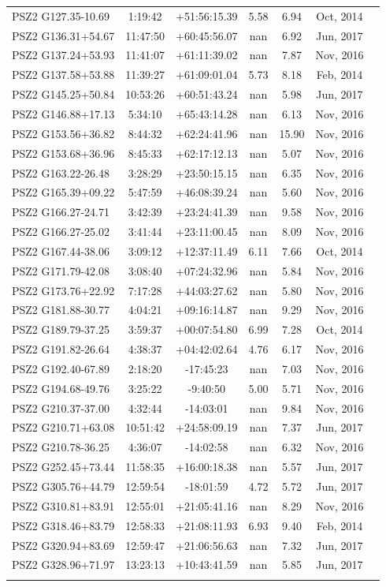\documentclass[apj, revtex4]{emulateapj}
\begin{document}
\begin{longtable*}{lcccccc}
PSZ2 G127.35-10.69 & 1:19:42 & +51:56:15.39 & 5.58 & 6.94 & Oct, 2014\\
PSZ2 G136.31+54.67 & 11:47:50 & +60:45:56.07 & nan & 6.92 & Jun, 2017\\
PSZ2 G137.24+53.93 & 11:41:07 & +61:11:39.02 & nan & 7.87 & Nov, 2016\\
PSZ2 G137.58+53.88 & 11:39:27 & +61:09:01.04 & 5.73 & 8.18 & Feb, 2014\\
PSZ2 G145.25+50.84 & 10:53:26 & +60:51:43.24 & nan & 5.98 & Jun, 2017\\
PSZ2 G146.88+17.13 & 5:34:10 & +65:43:14.28 & nan & 6.13 & Nov, 2016\\
PSZ2 G153.56+36.82 & 8:44:32 & +62:24:41.96 & nan & 15.90 & Nov, 2016\\
PSZ2 G153.68+36.96 & 8:45:33 & +62:17:12.13 & nan & 5.07 & Nov, 2016\\
PSZ2 G163.22-26.48 & 3:28:29 & +23:50:15.15 & nan & 6.35 & Nov, 2016\\
PSZ2 G165.39+09.22 & 5:47:59 & +46:08:39.24 & nan & 5.60 & Nov, 2016\\
PSZ2 G166.27-24.71 & 3:42:39 & +23:24:41.39 & nan & 9.58 & Nov, 2016\\
PSZ2 G166.27-25.02 & 3:41:44 & +23:11:00.45 & nan & 8.09 & Nov, 2016\\
PSZ2 G167.44-38.06 & 3:09:12 & +12:37:11.49 & 6.11 & 7.66 & Oct, 2014\\
PSZ2 G171.79-42.08 & 3:08:40 & +07:24:32.96 & nan & 5.84 & Nov, 2016\\
PSZ2 G173.76+22.92 & 7:17:28 & +44:03:27.62 & nan & 5.80 & Nov, 2016\\
PSZ2 G181.88-30.77 & 4:04:21 & +09:16:14.87 & nan & 9.29 & Nov, 2016\\
PSZ2 G189.79-37.25 & 3:59:37 & +00:07:54.80 & 6.99 & 7.28 & Oct, 2014\\
PSZ2 G191.82-26.64 & 4:38:37 & +04:42:02.64 & 4.76 & 6.17 & Nov, 2016\\
PSZ2 G192.40-67.89 & 2:18:20 & -17:45:23 & nan & 7.03 & Nov, 2016\\
PSZ2 G194.68-49.76 & 3:25:22 & -9:40:50 & 5.00 & 5.71 & Nov, 2016\\
PSZ2 G210.37-37.00 & 4:32:44 & -14:03:01 & nan & 9.84 & Nov, 2016\\
PSZ2 G210.71+63.08 & 10:51:42 & +24:58:09.19 & nan & 7.37 & Jun, 2017\\
PSZ2 G210.78-36.25 & 4:36:07 & -14:02:58 & nan & 6.32 & Nov, 2016\\
PSZ2 G252.45+73.44 & 11:58:35 & +16:00:18.38 & nan & 5.57 & Jun, 2017\\
PSZ2 G305.76+44.79 & 12:59:54 & -18:01:59 & 4.72 & 5.72 & Jun, 2017\\
PSZ2 G310.81+83.91 & 12:55:01 & +21:05:41.16 & nan & 8.29 & Nov, 2016\\
PSZ2 G318.46+83.79 & 12:58:33 & +21:08:11.93 & 6.93 & 9.40 & Feb, 2014\\
PSZ2 G320.94+83.69 & 12:59:47 & +21:06:56.63 & nan & 7.32 & Jun, 2017\\
PSZ2 G328.96+71.97 & 13:23:13 & +10:43:41.59 & nan & 5.85 & Jun, 2017\\
	\hline
	\label{tbl:targets}
\end{longtable*}
\end{document}
